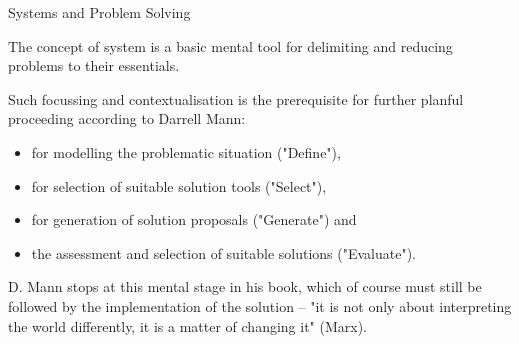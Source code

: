 \documentclass{beamer}
\title{On the Notion of a Resource\vskip1em}
\subtitle{Research Seminar in the Module 10-202-2312\\ for Master Computer
  Science}
\author{Prof. Dr. Hans-Gert Gräbe\\
\url{http://www.informatik.uni-leipzig.de/~graebe}}
\date{April 2022}
\begin{document}
{
\begin{frame}
  \titlepage
\end{frame}}

\begin{frame}{Systems and Problem Solving}

The concept of system is a basic mental tool for delimiting and reducing
problems to their essentials.

Such focussing and contextualisation is the prerequisite for further planful
proceeding according to Darrell Mann: 
\begin{itemize}
\item for modelling the problematic situation ("Define"), 
\item for selection of suitable solution tools ("Select"), 
\item for generation of solution proposals ("Generate") and 
\item the assessment and selection of suitable solutions ("Evaluate").
\end{itemize}

D. Mann stops at this mental stage in his book, which of course must still be
followed by the implementation of the solution -- "it is not only about
interpreting the world differently, it is a matter of changing it" (Marx).
\end{frame}
\end{document}
